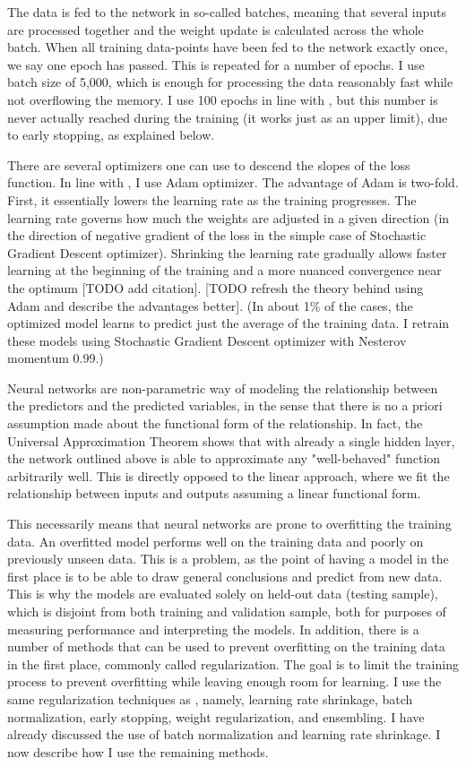 	The data is fed to the network in so-called batches, meaning that several inputs are processed together and the weight update is calculated across the whole batch. When all training data-points have been fed to the network exactly once, we say one epoch has passed. This is repeated for a number of epochs. I use batch size of 5,000, which is enough for processing the data reasonably fast while not overflowing the memory. I use 100 epochs in line with \cite{gu2020empirical}, but this number is never actually reached during the training (it works just as an upper limit), due to early stopping, as explained below.
	
	There are several optimizers one can use to descend the slopes of the loss function. In line with \cite{gu2020empirical}, I use Adam optimizer. The advantage of Adam is two-fold. First, it essentially lowers the learning rate as the training progresses. The learning rate governs how much the weights are adjusted in a given direction (in the direction of negative gradient of the loss in the simple case of Stochastic Gradient Descent optimizer). Shrinking the learning rate gradually allows faster learning at the beginning of the training and a more nuanced convergence near the optimum [TODO add citation]. [TODO refresh the theory behind using Adam and describe the advantages better]. (In about 1\% of the cases, the optimized model learns to predict just the average of the training data. I retrain these models using Stochastic Gradient Descent optimizer with Nesterov momentum 0.99.)
	
	Neural networks are non-parametric way of modeling the relationship between the predictors and the predicted variables, in the sense that there is no a priori assumption made about the functional form of the relationship. In fact, the Universal Approximation Theorem shows that with already a single hidden layer, the network outlined above is able to approximate any "well-behaved" function arbitrarily well. This is directly opposed to the linear approach, where we fit the relationship between inputs and outputs assuming a linear functional form. 
	
	This necessarily means that neural networks are prone to overfitting the training data. An overfitted model performs well on the training data and poorly on previously unseen data. This is a problem, as the point of having a model in the first place is to be able to draw general conclusions and predict from new data. This is why the models are evaluated solely on held-out data (testing sample), which is disjoint from both training and validation sample, both for purposes of measuring performance and interpreting the models. In addition, there is a number of methods that can be used to prevent overfitting on the training data in the first place, commonly called regularization. The goal is to limit the training process to prevent overfitting while leaving enough room for learning. I use the same regularization techniques as \cite{gu2020empirical}, namely, learning rate shrinkage, batch normalization, early stopping, weight regularization, and ensembling. I have already discussed the use of batch normalization and learning rate shrinkage. I now describe how I use the remaining methods. 
	
